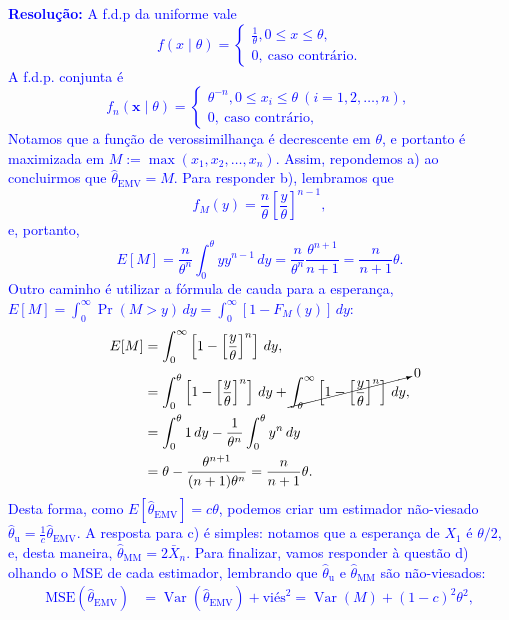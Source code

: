 \documentclass[a4paper,10pt, notitlepage]{report}
\newcommand{\pr}{\operatorname{Pr}} %
\newcommand{\vr}{\operatorname{Var}} %
\newcommand{\emv}{\hat{\theta}_{\text{EMV}}}
\begin{document}
\textcolor{blue}{
\textbf{Resolução:}
 A f.d.p da uniforme vale
 \begin{equation*}
  \label{eq:uniform_closed}
  f(x\mid \theta)=
 \begin{cases}
     \frac{1}{\theta}, 0 \leq x \leq \theta,\\
     0,\:\text{caso contrário}.
\end{cases}
  \end{equation*}
A f.d.p. conjunta é
\begin{equation*}
 \label{eq:uniform_closed_joint}
   f_n(\boldsymbol{x} \mid \theta)=
 \begin{cases}
     \theta^{-n}, 0 \leq x_i \leq \theta \: (i = 1, 2, \ldots, n),\\
     0,\:\text{caso contrário},
\end{cases}
\end{equation*}
Notamos que a função de verossimilhança é decrescente em $\theta$, e portanto é maximizada em $M := \max(x_1, x_2, \ldots, x_n)$.
Assim, repondemos a) ao concluirmos que $\emv = M$.
Para responder b), lembramos que
$$f_M(y) = \frac{n}{\theta} \left[\frac{y}{\theta}\right]^{n-1}, $$
e, portanto,
$$E[M] = \frac{n}{\theta^n} \int_{0}^\theta y y^{n-1}\,dy = \frac{n}{\theta^n}\frac{\theta^{n +1}}{n+ 1} = \frac{n}{n + 1} \theta.$$
Outro caminho é utilizar a fórmula de cauda para a esperança, $E[M] = \int_{0}^\infty \pr(M > y)\, dy = \int_{0}^\infty \left[ 1- F_M(y)\right]\, dy$:
\begin{align*}
 E[M] &= \int_{0}^\infty \left[ 1- \left[\frac{y}{\theta}\right]^n \right]\, dy,\\
 &= \int_{0}^\theta \left[ 1- \left[\frac{y}{\theta}\right]^n \right]\, dy + \cancelto{0}{\int_{\theta}^\infty \left[ 1- \left[\frac{y}{\theta}\right]^n \right]\, dy},\\
 &= \int_{0}^\theta 1\, dy - \frac{1}{\theta^n}\int_{0}^\theta y^n\,dy\\
 &= \theta - \frac{\theta^{n+1}}{(n+1)\theta^n} = \frac{n}{n+1}\theta.
\end{align*}
Desta forma, como $E[\emv] = c\theta$, podemos criar um estimador não-viesado $\hat{\theta}_{\text{u}} = \frac{1}{c}\emv$.
A resposta para c) é simples: notamos que a esperança de $X_1$ é $\theta/2$, e, desta maneira, $\hat{\theta}_{\text{MM}} = 2\bar{X}_n$.
Para finalizar, vamos responder à questão d) olhando o MSE de cada estimador, lembrando que $\hat{\theta}_{\text{u}}$ e $\hat{\theta}_{\text{MM}}$ são não-viesados:
\begin{align*}
 \text{MSE}(\emv) &= \vr(\emv) + \text{viés}^2 = \vr(M) + (1-c)^2\theta^2,\\

\end{align*}}
\end{document}
